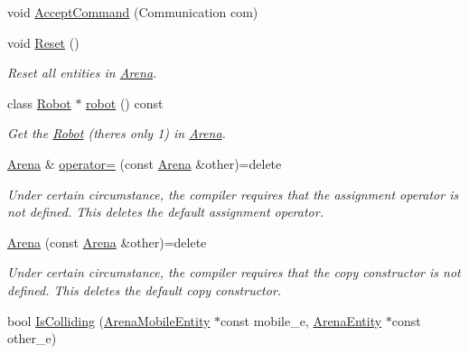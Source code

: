 \begin{DoxyCompactItemize}
\item 
void \mbox{\hyperlink{class_arena_a16fac8e4b2399fcf0db01a9722069c33}{Accept\+Command}} (Communication com)
\item 
\mbox{\label{class_arena_a95e295d03a14385f4402a8e839fbae9b}} 
void \mbox{\hyperlink{class_arena_a95e295d03a14385f4402a8e839fbae9b}{Reset}} ()
\begin{DoxyCompactList}\small\item\em Reset all entities in \mbox{\hyperlink{class_arena}{Arena}}. \end{DoxyCompactList}\item 
class \mbox{\hyperlink{class_robot}{Robot}} $\ast$ \mbox{\hyperlink{class_arena_ab5399d939d79002a8794bf9b8a75d73a}{robot}} () const
\begin{DoxyCompactList}\small\item\em Get the \mbox{\hyperlink{class_robot}{Robot}} (there\textquotesingle{}s only 1) in \mbox{\hyperlink{class_arena}{Arena}}. \end{DoxyCompactList}\item 
\mbox{\label{class_arena_aa977a50aa4a5570a2a553705f1909e9b}} 
\mbox{\hyperlink{class_arena}{Arena}} \& \mbox{\hyperlink{class_arena_aa977a50aa4a5570a2a553705f1909e9b}{operator=}} (const \mbox{\hyperlink{class_arena}{Arena}} \&other)=delete
\begin{DoxyCompactList}\small\item\em Under certain circumstance, the compiler requires that the assignment operator is not defined. This {\ttfamily deletes} the default assignment operator. \end{DoxyCompactList}\item 
\mbox{\label{class_arena_afce6e35e1470823539dc9194bef77499}} 
\mbox{\hyperlink{class_arena_afce6e35e1470823539dc9194bef77499}{Arena}} (const \mbox{\hyperlink{class_arena}{Arena}} \&other)=delete
\begin{DoxyCompactList}\small\item\em Under certain circumstance, the compiler requires that the copy constructor is not defined. This {\ttfamily deletes} the default copy constructor. \end{DoxyCompactList}\item 
bool \mbox{\hyperlink{class_arena_ab4479b0268867602d0c4b510d5f99aff}{Is\+Colliding}} (\mbox{\hyperlink{class_arena_mobile_entity}{Arena\+Mobile\+Entity}} $\ast$const mobile\+\_\+e, \mbox{\hyperlink{class_arena_entity}{Arena\+Entity}} $\ast$const other\+\_\+e)

\end{DoxyCompactItemize}
